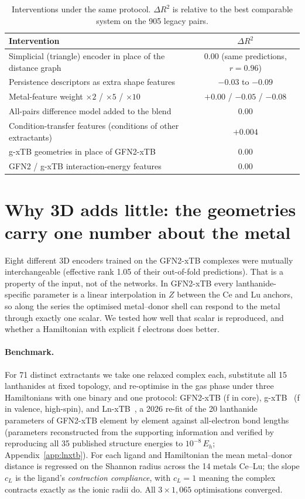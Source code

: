 \documentclass{article}
\begin{document}
\begin{table}[t]
	\centering
	\caption{Interventions under the same protocol. $\Delta R^2$ is relative to the best comparable system on the 905 legacy pairs.}
	\label{tab:neg}
	\begin{tabular}{lc}
		\toprule
		Intervention & $\Delta R^2$ \\
		\midrule
		Simplicial (triangle) encoder in place of the distance graph & $0.00$ (same predictions, $r = 0.96$) \\
		Persistence descriptors as extra shape features & $-0.03$ to $-0.09$ \\
		Metal-feature weight $\times 2$ / $\times 5$ / $\times 10$ & $+0.00$ / $-0.05$ / $-0.08$ \\
		All-pairs difference model added to the blend & $0.00$ \\
		Condition-transfer features (conditions of other extractants) & $+0.004$ \\
		g-xTB geometries in place of GFN2-xTB & $0.00$ \\
		GFN2 / g-xTB interaction-energy features & $0.00$ \\
		\bottomrule
	\end{tabular}
\end{table}

\section{Why 3D adds little: the geometries carry one number about the metal}
\label{sec:chem}

Eight different 3D encoders trained on the GFN2-xTB complexes were mutually interchangeable (effective rank 1.05 of their out-of-fold predictions).
That is a property of the input, not of the networks.
In GFN2-xTB every lanthanide-specific parameter is a linear interpolation in $Z$ between the Ce and Lu anchors, so along the series the optimised metal--donor shell can respond to the metal through exactly one scalar.
We tested how well that scalar is reproduced, and whether a Hamiltonian with explicit f electrons does better.

\paragraph{Benchmark.}
For 71 distinct extractants we take one relaxed complex each, substitute all 15 lanthanides at fixed topology, and re-optimise in the gas phase under three Hamiltonians with one binary and one protocol: GFN2-xTB (f in core), g-xTB~\cite{froitzheim2025gxtb} (f in valence, high-spin), and Ln-xTB~\cite{zhang2026lnxtb}, a 2026 re-fit of the 20 lanthanide parameters of GFN2-xTB element by element against all-electron bond lengths (parameters reconstructed from the supporting information and verified by reproducing all 35 published structure energies to $10^{-8}$\,$E_h$; Appendix~\ref{app:lnxtb}).
For each ligand and Hamiltonian the mean metal--donor distance is regressed on the Shannon radius across the 14 metals Ce--Lu; the slope $c_L$ is the ligand's \emph{contraction compliance}, with $c_L = 1$ meaning the complex contracts exactly as the ionic radii do.
All $3 \times 1{,}065$ optimisations converged.
\end{document}
